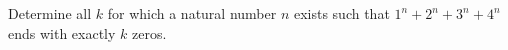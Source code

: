Determine all $k$ for which a natural number $n$ exists
such that $1^n+2^n+3^n+4^n$ ends with exactly $k$ zeros.